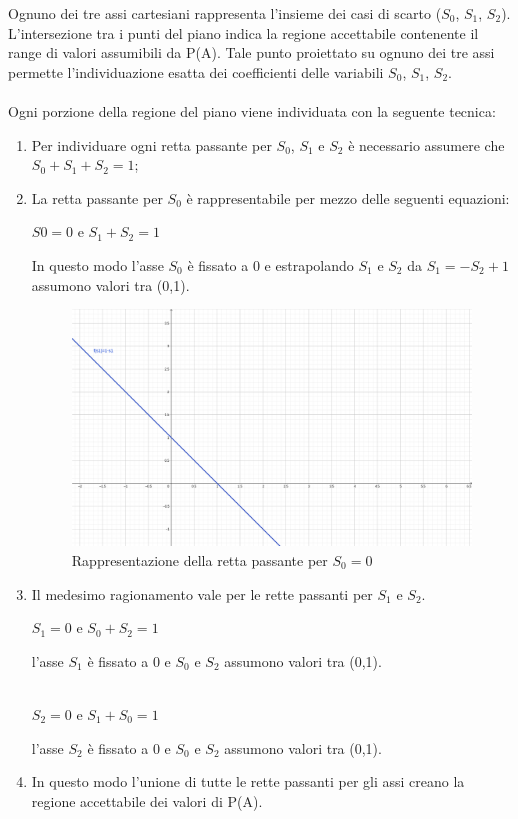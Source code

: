 \noindent
Ognuno dei tre assi cartesiani rappresenta l'insieme dei casi di scarto ($S_0$, $S_1$, $S_2$). L'intersezione tra i punti del piano indica la regione accettabile contenente il range di valori assumibili da P(A). Tale punto proiettato su ognuno dei tre assi permette l'individuazione esatta dei coefficienti delle variabili $S_0$, $S_1$, $S_2$.\\\\
Ogni porzione della regione del piano viene individuata con la seguente tecnica:
\begin{enumerate}
\item Per individuare ogni retta passante per $S_0$, $S_1$ e $S_2$ \`e necessario assumere che $S_0+S_1+S_2=1$;
\item La retta passante per $S_0$ \`e rappresentabile per mezzo delle seguenti equazioni:
\begin{center}$S0=0$ e $S_1+S_2=1$\end{center}
In questo modo l'asse $S_0$ \`e fissato a 0 e estrapolando $S_1$ e $S_2$ da $S_1=-S_2+1$  assumono valori tra (0,1). 
\begin{figure}[H]
\centering
	\includegraphics[width=0.90\linewidth]{./image/equazioneretta.png}
	\caption{Rappresentazione della retta passante per $S_0=0$}
	\label{Rappresentazione della retta passante per S_0=0}
\end{figure}
\item Il medesimo ragionamento vale per le rette passanti per $S_1$ e $S_2$.

\begin{center}$S_1=0$ e $S_0+S_2=1$\end{center}
l'asse $S_1$ \`e fissato a 0 e $S_0$ e $S_2$ assumono valori tra (0,1).\\\\

\begin{center} $S_2=0$ e $S_1+S_0=1$ \end{center}
l'asse $S_2$ \`e fissato a 0 e $S_0$ e $S_2$ assumono valori tra (0,1).

\item In questo modo l'unione di tutte le rette passanti per gli assi creano la regione accettabile dei valori di P(A).
\end{enumerate}

